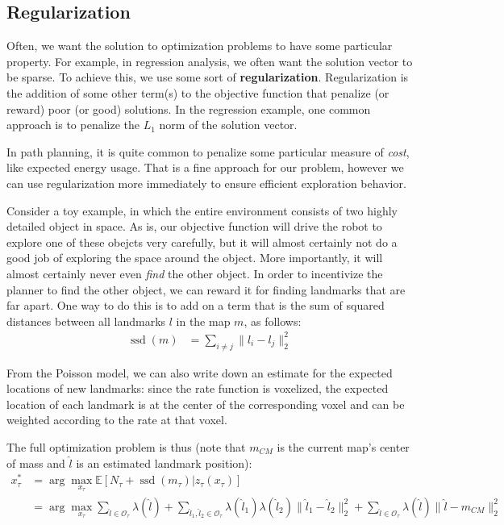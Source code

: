 \documentclass[12pt]{article}
\DeclareMathOperator{\ssd}{ssd}
\begin{document}
\subsection{Regularization}

Often, we want the solution to optimization problems to have some particular property. For example, in regression analysis, we often want the solution vector to be sparse. To achieve this, we use some sort of \textbf{regularization}. Regularization is the addition of some other term(s) to the objective function that penalize (or reward) poor (or good) solutions. In the regression example, one common approach is to penalize the $L_1$ norm of the solution vector.

In path planning, it is quite common to penalize some particular measure of \textit{cost}, like expected energy usage. That is a fine approach for our problem, however we can use regularization more immediately to ensure efficient exploration behavior.

Consider a toy example, in which the entire environment consists of two highly detailed object in space. As is, our objective function will drive the robot to explore one of these obejcts very carefully, but it will almost certainly not do a good job of exploring the space around the object. More importantly, it will almost certainly never even \textit{find} the other object. In order to incentivize the planner to find the other object, we can reward it for finding landmarks that are far apart. One way to do this is to add on a term that is the sum of squared distances between all landmarks $l$ in the map $m$, as follows:
\begin{align}
  \ssd(m) &= \sum_{i \ne j} \|l_i - l_j\|_2^2
\end{align}

From the Poisson model, we can also write down an estimate for the expected locations of new landmarks: since the rate function is voxelized, the expected location of each landmark is at the center of the corresponding voxel and can be weighted according to the rate at that voxel.

The full optimization problem is thus (note that $m_{CM}$ is the current map's center of mass and $\hat l$ is an estimated landmark position):
\begin{align}
  x_{\tau}^*
  &= \arg \max_{x_{\tau}} \mathbb{E}[N_{\tau} + \ssd(m_{\tau}) | z_{\tau}(x_{\tau})]\\
  &= \arg \max_{x_{\tau}} \sum_{\hat l \in \mathcal{O_{\tau}}} \lambda(\hat l) + \sum_{\hat l_1, \hat l_2 \in \mathcal{O}_{\tau}} \lambda(\hat l_1) \lambda(\hat l_2) \|\hat l_1 - \hat l_2\|_2^2 + \sum_{\hat l \in \mathcal{O}_{\tau}} \lambda(\hat l) \|\hat l - m_{CM}\|_2^2
\end{align}
\end{document}
